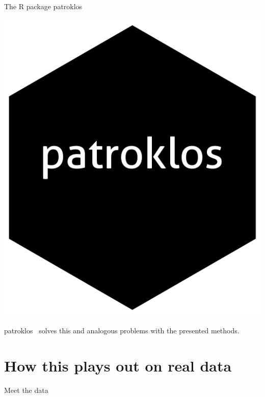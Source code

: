 \documentclass[10pt, aspectratio=169]{beamer}
\begin{document}
\begin{frame}{The R package patroklos}
  \begin{minipage}{0.15\textwidth}
    \centering
    \includegraphics[width=\textwidth]{figs/logo.png}
  \end{minipage}
  \hfill
  \begin{minipage}{0.8\textwidth}
    \raggedright
    patroklos~\citep{patroklos} solves this and analogous problems with the 
    presented methods.
  \end{minipage}
\end{frame}

\section{How this plays out on real data}

\begin{frame}{Meet the data}
  
\end{frame}
\end{document}
